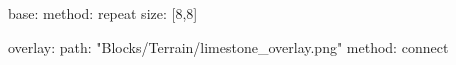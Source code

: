 base:
  method: repeat
  size: [8,8]

overlay:
  path: "Blocks/Terrain/limestone_overlay.png"
  method: connect
